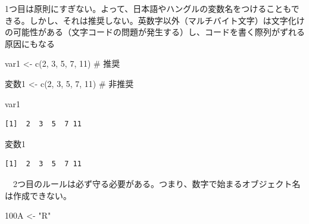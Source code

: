 \documentclass[
  a4paper,
  pandoc,
  ja=standard,
  jafont=haranoaji]{bxjsbook}
\newenvironment{Shaded}{\begin{snugshade}}{\end{snugshade}}
\newcommand{\CommentTok}[1]{\textcolor[rgb]{0.37,0.37,0.37}{#1}}
\newcommand{\DecValTok}[1]{\textcolor[rgb]{0.68,0.00,0.00}{#1}}
\newcommand{\FunctionTok}[1]{\textcolor[rgb]{0.28,0.35,0.67}{#1}}
\newcommand{\NormalTok}[1]{\textcolor[rgb]{0.00,0.48,0.65}{#1}}
\newcommand{\OtherTok}[1]{\textcolor[rgb]{0.00,0.48,0.65}{#1}}
\newcommand{\StringTok}[1]{\textcolor[rgb]{0.13,0.47,0.30}{#1}}
\begin{document}
1つ目は原則にすぎない。よって、日本語やハングルの変数名をつけることもできる。しかし、それは推奨しない。英数字以外（マルチバイト文字）は文字化けの可能性がある（文字コードの問題が発生する）し、コードを書く際列がずれる原因にもなる

\begin{Shaded}
\begin{Highlighting}[numbers=left,,]
\NormalTok{var1 }\OtherTok{\textless{}{-}} \FunctionTok{c}\NormalTok{(}\DecValTok{2}\NormalTok{, }\DecValTok{3}\NormalTok{, }\DecValTok{5}\NormalTok{, }\DecValTok{7}\NormalTok{, }\DecValTok{11}\NormalTok{)      }\CommentTok{\# 推奨}
\end{Highlighting}
\end{Shaded}

\begin{Shaded}
\begin{Highlighting}[numbers=left,,]
\NormalTok{変数1 }\OtherTok{\textless{}{-}} \FunctionTok{c}\NormalTok{(}\DecValTok{2}\NormalTok{, }\DecValTok{3}\NormalTok{, }\DecValTok{5}\NormalTok{, }\DecValTok{7}\NormalTok{, }\DecValTok{11}\NormalTok{)     }\CommentTok{\# 非推奨}
\end{Highlighting}
\end{Shaded}

\begin{Shaded}
\begin{Highlighting}[numbers=left,,]
\NormalTok{var1}
\end{Highlighting}
\end{Shaded}

\begin{verbatim}
[1]  2  3  5  7 11
\end{verbatim}

\begin{Shaded}
\begin{Highlighting}[numbers=left,,]
\NormalTok{変数1}
\end{Highlighting}
\end{Shaded}

\begin{verbatim}
[1]  2  3  5  7 11
\end{verbatim}

　2つ目のルールは必ず守る必要がある。つまり、数字で始まるオブジェクト名は作成できない。

\begin{Shaded}
\begin{Highlighting}[numbers=left,,]
\NormalTok{100A }\OtherTok{\textless{}{-}} \StringTok{"R"}
\end{Highlighting}
\end{Shaded}
\end{document}
